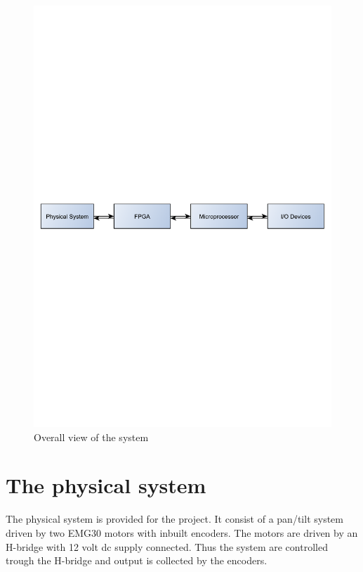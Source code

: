\begin{figure}[htb]
	\centering
	\includegraphics[scale=0.6,trim=400 400 400 400]{graphics/firstsystem} %
	\caption{Overall view of the system}
	\label{fig:firstsystem}			%
\end{figure}

\section{The physical system}\label{sec:phsycicalsystem}

The physical system is provided for the project. It consist of a pan/tilt system driven by two EMG30 \cite{emg30} motors with inbuilt encoders. The motors are driven by an H-bridge \cite{hbridge} with 12 volt dc supply connected. Thus the system are controlled trough the H-bridge and output is collected by the encoders.

